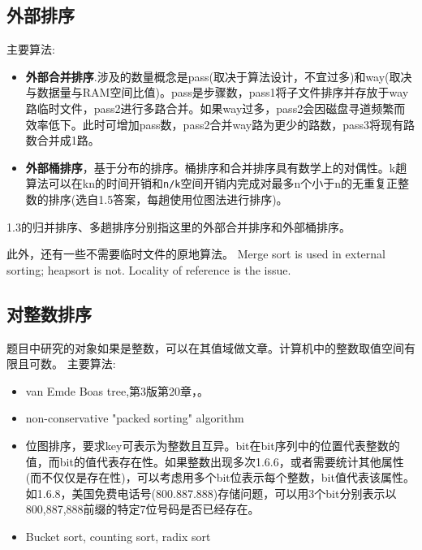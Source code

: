 \subsection{外部排序}
主要算法\cite{wikipedia}:
\begin{itemize}
    \item 
        \textbf{外部合并排序}\cite{wikipedia}.涉及的数量概念是pass(取决于算法设计，不宜过多)和way(取决与数据量与RAM空间比值)。pass是步骤数，pass1将子文件排序并存放于way路临时文件，pass2进行多路合并。如果way过多，pass2会因磁盘寻道频繁而效率低下。此时可增加pass数，pass2合并way路为更少的路数，pass3将现有路数合并成1路。
    \item 
	\textbf{外部桶排序}，基于分布的排序。桶排序和合并排序具有数学上的对偶性\cite{weijipedia}。k趟算法可以在kn的时间开销和\verb|n/k|空间开销内完成对最多n个小于n的无重复正整数的排序(选自\cite{pp}1.5答案，每趟使用位图法进行排序)。
\end{itemize}
\cite{pp}1.3的归并排序、多趟排序分别指这里的外部合并排序和外部桶排序。

此外，还有一些不需要临时文件的原地算法。 Merge sort is used in external sorting; heapsort is not. Locality of reference is the issue.



\subsection{对整数排序}
\cite{wikipedia}
题目中研究的对象如果是整数，可以在其值域做文章。计算机中的整数取值空间有限且可数。
主要算法:
\begin{itemize}
    \item 
van Emde Boas tree,\cite{ita}第3版第20章，\cite{wikipedia}。
    \item 
non-conservative "packed sorting" algorithm
    \item 
	位图排序，要求key可表示为整数且互异。bit在bit序列中的位置代表整数的值，而bit的值代表存在性。如果整数出现多次\cite{pp}1.6.6，或者需要统计其他属性(而不仅仅是存在性)，可以考虑用多个bit位表示每个整数，bit值代表该属性。如\cite{pp}1.6.8，美国免费电话号(800.887.888)存储问题，可以用3个bit分别表示以800,887,888前缀的特定7位号码是否已经存在\cite{self}。
    \item 
Bucket sort, counting sort, radix sort
\end{itemize}

